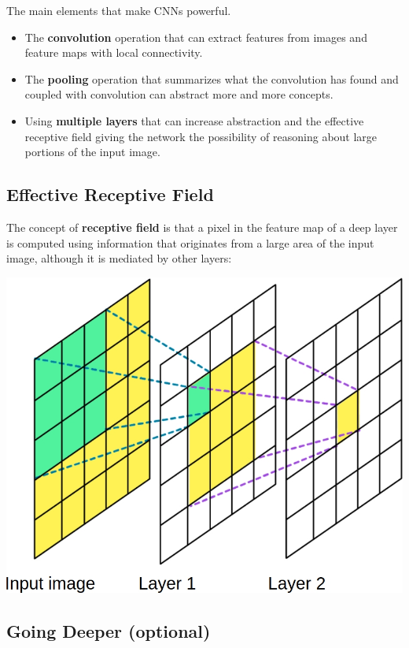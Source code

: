 The main elements that make CNNs powerful.
\begin{itemize}
    \item The \textbf{convolution} operation that can extract features from images and feature maps with local connectivity.
    \item The \textbf{pooling} operation that summarizes what the convolution has found and coupled with convolution can abstract more and more concepts.
    \item Using \textbf{multiple layers} that can increase abstraction and the effective receptive field giving the network the possibility of reasoning about large portions of the input image.
\end{itemize}

\subsection{Effective Receptive Field}

The concept of \textbf{receptive field} is that a pixel in the feature map of a deep layer is computed using information that originates from a large area of the input image, although it is mediated by other layers:

\includegraphics[width=1\linewidth]{img//cnn//concepts/effective-receptive-field.jpeg}
\label{fig:effective-receptive-field}

\subsection{Going Deeper (optional)}


